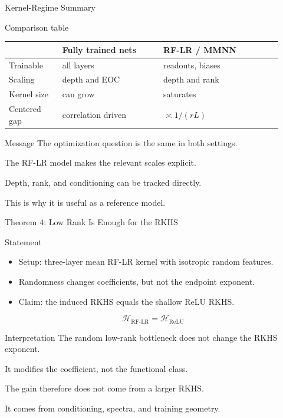 \documentclass[aspectratio=169]{beamer}
\begin{document}
\begin{frame}{Kernel-Regime Summary}
  \scriptsize
  \begin{block}{Comparison table}
    \centering
    \begin{tabular}{@{}p{0.18\linewidth}p{0.34\linewidth}p{0.40\linewidth}@{}}
      \toprule
      & \textbf{Fully trained nets} & \textbf{RF-LR / MMNN} \\
      \midrule
      Trainable & all layers & readouts, biases \\
      Scaling & depth and EOC & depth and rank \\
      Kernel size & can grow & saturates \\
      Centered gap & correlation driven & $\asymp 1/(rL)$ \\
      \bottomrule
    \end{tabular}
  \end{block}
  \begin{alertblock}{Message}
    The optimization question is the same in both settings.

    The RF-LR model makes the relevant scales explicit.

    Depth, rank, and conditioning can be tracked directly.

    This is why it is useful as a reference model.
  \end{alertblock}
\end{frame}

\begin{frame}{Theorem 4: Low Rank Is Enough for the RKHS}
  \small
  \begin{block}{Statement}
    \begin{itemize}
      \item Setup: three-layer mean RF-LR kernel with isotropic random features.
      \item Randomness changes coefficients, but not the endpoint exponent.
      \item Claim: the induced RKHS equals the shallow ReLU RKHS.
    \end{itemize}
    \[
    \mathcal{H}_{\mathrm{RF\text{-}LR}}=\mathcal{H}_{\mathrm{ReLU}}
    \]
  \end{block}
  \begin{alertblock}{Interpretation}
    The random low-rank bottleneck does not change the RKHS exponent.

    It modifies the coefficient, not the functional class.

    The gain therefore does not come from a larger RKHS.

    It comes from conditioning, spectra, and training geometry.
  \end{alertblock}
\end{frame}
\end{document}
